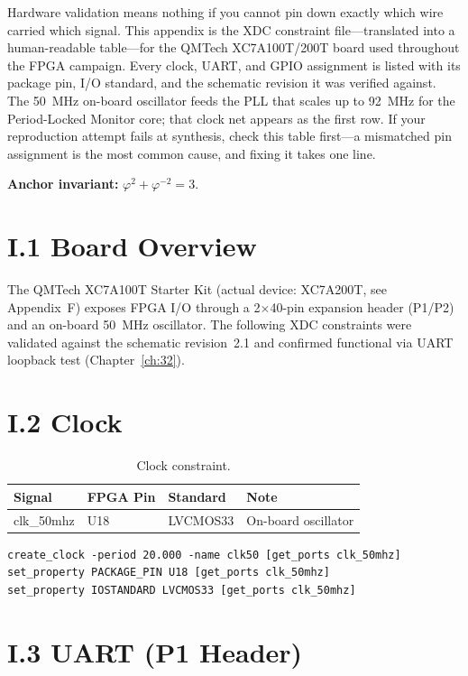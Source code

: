 Hardware validation means nothing if you cannot pin down exactly which wire
carried which signal. This appendix is the XDC constraint file---translated
into a human-readable table---for the QMTech XC7A100T/200T board used throughout
the FPGA campaign. Every clock, UART, and GPIO assignment is listed with its
package pin, I/O standard, and the schematic revision it was verified against.
The 50~MHz on-board oscillator feeds the PLL that scales up to 92~MHz for the
Period-Locked Monitor core; that clock net appears as the first row. If your
reproduction attempt fails at synthesis, check this table first---a mismatched
pin assignment is the most common cause, and fixing it takes one line.

\textbf{Anchor invariant:} \(\varphi^2 + \varphi^{-2} = 3\).

\section*{I.1 Board Overview}
\label{sec:appI-board}

The QMTech XC7A100T Starter Kit (actual device: XC7A200T, see Appendix~F)
exposes FPGA I/O through a 2$\times$40-pin expansion header (P1/P2) and an on-board
50~MHz oscillator. The following XDC constraints were validated against the
schematic revision~2.1 and confirmed functional via UART loopback test
(Chapter~\ref{ch:32}).

\section*{I.2 Clock}
\label{sec:appI-clock}

\begin{table}[h]
\centering
\begin{tabular}{llll}
\toprule
\textbf{Signal} & \textbf{FPGA Pin} & \textbf{Standard} & \textbf{Note} \\
\midrule
clk\_50mhz & U18 & LVCMOS33 & On-board oscillator \\
\bottomrule
\end{tabular}
\caption{Clock constraint.}
\end{table}

\begin{verbatim}
create_clock -period 20.000 -name clk50 [get_ports clk_50mhz]
set_property PACKAGE_PIN U18 [get_ports clk_50mhz]
set_property IOSTANDARD LVCMOS33 [get_ports clk_50mhz]
\end{verbatim}

\section*{I.3 UART (P1 Header)}
\label{sec:appI-uart}

